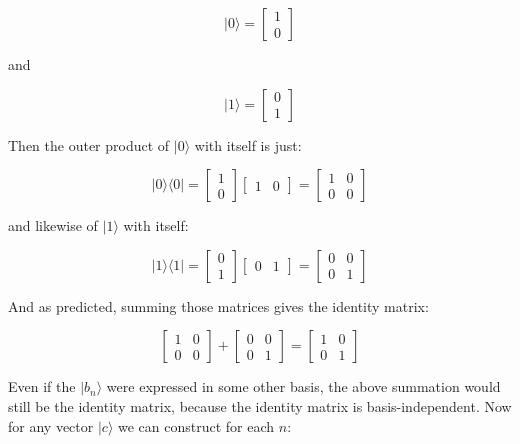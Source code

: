 $$|0 \rangle = \begin{bmatrix} 1 \\ 0 \end{bmatrix}$$

and

$$|1 \rangle = \begin{bmatrix} 0 \\ 1 \end{bmatrix}$$

Then the outer product of $|0 \rangle$ with itself is just:

$$
|0 \rangle \langle 0| = 
\begin{bmatrix} 1 \\ 0 \end{bmatrix}
\begin{bmatrix} 1 & 0 \end{bmatrix} =
\begin{bmatrix} 1 & 0 \\ 0 & 0 \end{bmatrix}
$$

and likewise of $|1 \rangle$ with itself:

$$
|1 \rangle \langle 1| = 
\begin{bmatrix} 0 \\ 1 \end{bmatrix}
\begin{bmatrix} 0 & 1 \end{bmatrix} =
\begin{bmatrix} 0 & 0 \\ 0 & 1 \end{bmatrix}
$$

And as predicted, summing those matrices gives the identity matrix:

$$
\begin{bmatrix} 1 & 0 \\ 0 & 0 \end{bmatrix} +
\begin{bmatrix} 0 & 0 \\ 0 & 1 \end{bmatrix} =
\begin{bmatrix} 1 & 0 \\ 0 & 1 \end{bmatrix}
$$

Even if the $|b_n \rangle$ were expressed in some other basis, the above summation would still be the identity matrix, because the identity matrix is basis-independent. Now for any vector $|c \rangle$ we can construct for each $n$:

